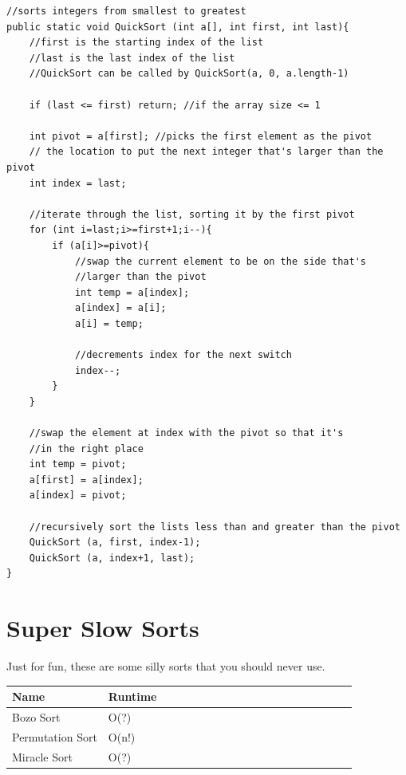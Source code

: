 \documentclass[11pt,oneside]{book}
\begin{document}
\begin{lstlisting}
//sorts integers from smallest to greatest
public static void QuickSort (int a[], int first, int last){
    //first is the starting index of the list
    //last is the last index of the list
    //QuickSort can be called by QuickSort(a, 0, a.length-1)
    
    if (last <= first) return; //if the array size <= 1
    
    int pivot = a[first]; //picks the first element as the pivot
    // the location to put the next integer that's larger than the pivot
    int index = last;  
    
    //iterate through the list, sorting it by the first pivot
    for (int i=last;i>=first+1;i--){
        if (a[i]>=pivot){
            //swap the current element to be on the side that's 
            //larger than the pivot
            int temp = a[index];
            a[index] = a[i];
            a[i] = temp;
            
            //decrements index for the next switch
            index--;
        }
    }
    
    //swap the element at index with the pivot so that it's 
    //in the right place
    int temp = pivot;
    a[first] = a[index];
    a[index] = pivot;
    
    //recursively sort the lists less than and greater than the pivot
    QuickSort (a, first, index-1);
    QuickSort (a, index+1, last);
}
\end{lstlisting}

    \chapter{ Super Slow Sorts }
        

Just for fun, these are some silly sorts that you should never use.

\vspace{10px}\begin{tabulary}{0.4\linewidth}{|l|l|l|l|l|l|l|l|l|l|l|l|l|l|l|l|l|l|l}\hline


  Name &
  Runtime\\
\hline


  Bozo Sort &
  O(?)\\

  Permutation Sort &
  O(n!)\\

  Miracle Sort &
  O(?)\\

\hline\end{tabulary}
\end{document}
